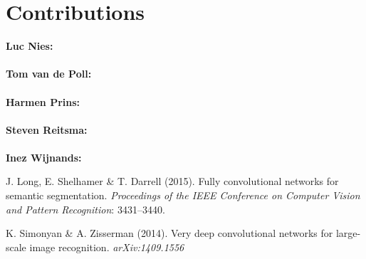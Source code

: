\documentclass{article}
\begin{document}
\appendix
\section{Contributions}
\textbf{Luc Nies:} \\
\\
\textbf{Tom van de Poll:} \\
\\
\textbf{Harmen Prins:} \\
\\
\textbf{Steven Reitsma:} \\
\\
\textbf{Inez Wijnands:} 



\begin{thebibliography}{}
J. Long, E. Shelhamer \& T. Darrell (2015). Fully convolutional networks for semantic segmentation. \emph{Proceedings of the IEEE Conference on Computer Vision and Pattern Recognition}: 3431--3440.

K. Simonyan \& A. Zisserman (2014). Very deep convolutional networks for large-scale image recognition. \emph{arXiv:1409.1556}


\end{thebibliography}
\end{document}

